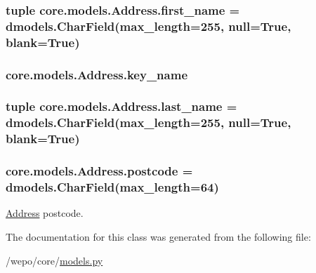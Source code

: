 \hypertarget{classcore_1_1models_1_1Address_a7d9c715a5bfb018bfc9ca178d91b6b8f}{
\subsubsection[{first\-\_\-name}]{\setlength{\rightskip}{0pt plus 5cm}tuple core.\-models.\-Address.\-first\-\_\-name = dmodels.\-Char\-Field(max\-\_\-length=255, null=True, blank=True)\hspace{0.3cm}{\ttfamily [static]}}}\label{classcore_1_1models_1_1Address_a7d9c715a5bfb018bfc9ca178d91b6b8f}
\hypertarget{classcore_1_1models_1_1Address_a5ebbca47356580cd05088f58d24d025c}{
\subsubsection[{key\-\_\-name}]{\setlength{\rightskip}{0pt plus 5cm}core.\-models.\-Address.\-key\-\_\-name}}\label{classcore_1_1models_1_1Address_a5ebbca47356580cd05088f58d24d025c}
\hypertarget{classcore_1_1models_1_1Address_abafe62dc9d25c167398a989a22caee51}{
\subsubsection[{last\-\_\-name}]{\setlength{\rightskip}{0pt plus 5cm}tuple core.\-models.\-Address.\-last\-\_\-name = dmodels.\-Char\-Field(max\-\_\-length=255, null=True, blank=True)\hspace{0.3cm}{\ttfamily [static]}}}\label{classcore_1_1models_1_1Address_abafe62dc9d25c167398a989a22caee51}
\hypertarget{classcore_1_1models_1_1Address_affbd91eecd5cf5488103ea1efc16100d}{
\subsubsection[{postcode}]{\setlength{\rightskip}{0pt plus 5cm}core.\-models.\-Address.\-postcode = dmodels.\-Char\-Field(max\-\_\-length=64)\hspace{0.3cm}{\ttfamily [static]}}}\label{classcore_1_1models_1_1Address_affbd91eecd5cf5488103ea1efc16100d}


\hyperlink{classcore_1_1models_1_1Address}{Address} postcode. 



The documentation for this class was generated from the following file\-:\begin{DoxyCompactItemize}
\item 
/wepo/core/\hyperlink{models_8py}{models.\-py}\end{DoxyCompactItemize}
